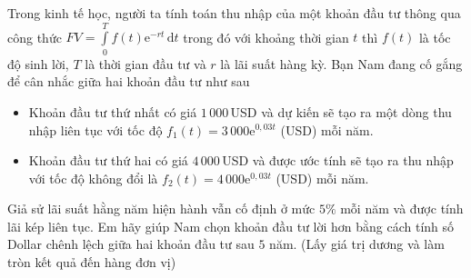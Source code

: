 \begin{ex}
{{}

}
\end{ex}

\begin{ex}%
Trong kinh tế học, người ta tính toán thu nhập của một khoản đầu tư thông qua công thức
$FV = \displaystyle\int\limits_0^T f(t) \mathrm{e}^{-rt} \mathrm{\,d}t$ trong đó với khoảng thời gian $t$ thì $f(t)$ là tốc độ sinh lời, $T$ là thời gian đầu tư và $r$ là lãi suất hàng kỳ. Bạn Nam đang cố gắng để cân nhắc giữa hai khoản đầu tư như sau
\begin{itemize}
\item Khoản đầu tư thứ nhất có giá $1\,000\,$USD và dự kiến sẽ tạo ra một dòng thu nhập liên tục với tốc độ $f_1(t) = 3\,000\mathrm{e}^{0{,}03t}$ (USD) mỗi năm.
\item Khoản đầu tư thứ hai có giá $4\,000\,$USD và được ước tính sẽ tạo ra thu nhập với tốc độ không đổi là $f_2(t) = 4\,000\mathrm{e}^{0{,}03t}$ (USD) mỗi năm.
\end{itemize}
Giả sử lãi suất hằng năm hiện hành vẫn cố định ở mức $5\%$ mỗi năm và được tính lãi kép liên tục. Em hãy giúp Nam chọn khoản đầu tư lời hơn bằng cách tính số Dollar chênh lệch giữa hai khoản đầu tư sau $5$ năm. (Lấy giá trị dương và làm tròn kết quả đến hàng đơn vị)
\par
{}
\end{ex}
